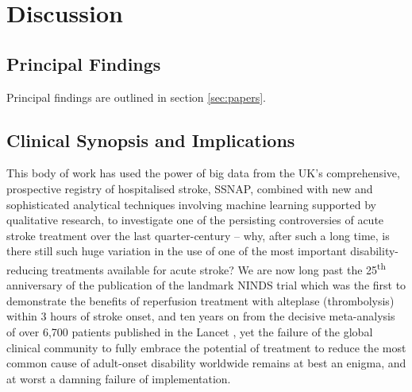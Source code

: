 \section{Discussion}

\subsection{Principal Findings}

Principal findings are outlined in section \ref{sec:papers}.

\subsection{Clinical Synopsis and Implications}

This body of work has used the power of big data from the UK’s comprehensive, prospective registry of hospitalised stroke, SSNAP, combined with new and sophisticated analytical techniques involving machine learning supported by qualitative research, to investigate one of the persisting controversies of acute stroke treatment over the last quarter-century – why, after such a long time, is there still such huge variation in the use of one of the most important disability-reducing treatments available for acute stroke? We are now long past the 25\textsuperscript{th} anniversary of the publication of the landmark NINDS trial which was the first to demonstrate the benefits of reperfusion treatment with alteplase (thrombolysis) within 3 hours of stroke onset, and ten years on from the decisive meta-analysis of over 6,700 patients published in the Lancet \cite{emberson_effect_2014}, yet the failure of the global clinical community to fully embrace the potential of treatment to reduce the most common cause of adult-onset disability worldwide remains at best an enigma, and at worst a damning failure of implementation.

